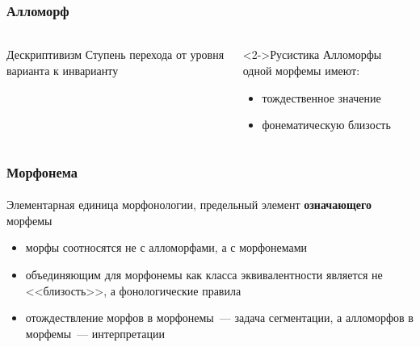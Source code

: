 \begin{frame}
    \frametitle{Алломорф}
    \framesubtitle{\autocite{gerd:2004:morph}}

    \begin{columns}
        \begin{block}{Дескриптивизм}
            Ступень перехода от уровня варианта к инварианту
        \end{block}

        \begin{block}<2->{Русистика}
            Алломорфы одной морфемы имеют: \begin{itemize}
                \item тождественное значение
                \item \alert{фонематическую близость}
            \end{itemize}
        \end{block}
    \end{columns}

    \vfill

\end{frame}

\begin{frame}
    \frametitle{Морфонема}
    \framesubtitle{\autocite{gerd:2004:morph}}

    \begin{exampleblock}{\autocite{les}}
        Элементарная единица морфонологии, предельный элемент \textbf{означающего} морфемы
    \end{exampleblock}

    \vfill

    \begin{itemize}
        \item морфы соотносятся не с алломорфами, а с морфонемами
        \item объединяющим для морфонемы как класса эквивалентности является не <<близость>>, а фонологические правила
        \item отождествление морфов в морфонемы~--- задача сегментации, а алломорфов в морфемы~--- интерпретации
    \end{itemize}
\end{frame}

